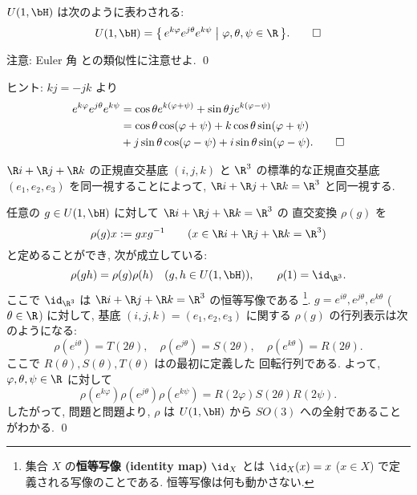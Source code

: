 \documentclass[12pt,twoside]{jarticle}
\begin{document}
\begin{question}
\label{q:U(1,H)-Euler-angle}
  $U(1,\bH)$ は次のように表わされる:
  \begin{equation*}
    U(1,\bH) =
    \bigl\{\, e^{k\varphi}e^{j\theta}e^{k\psi}
    \bigm| \varphi,\theta,\psi\in\R \,\bigr\}.
    \qed
  \end{equation*}
\end{question}

\noindent
注意: Euler 角  との類似性に注意せよ.
\qed

\medskip
\noindent
ヒント: $kj=-jk$ より
\begin{align*}
  e^{k\varphi}e^{j\theta}e^{k\psi}
  &= \cos\theta e^{k(\varphi+\psi)} + \sin\theta j e^{k(\varphi-\psi)}
  \\
  &= \cos\theta\cos(\varphi+\psi) + k\cos\theta\sin(\varphi+\psi)
  \\
  &+ j\sin\theta\cos(\varphi-\psi) + i\sin\theta\sin(\varphi-\psi).
\qed
\end{align*}

\medskip

$\R i+\R j+\R k$ の正規直交基底 $(i,j,k)$ 
と $\R^3$ の標準的な正規直交基底 $(e_1,e_2,e_3)$ 
を同一視することによって, $\R i+\R j+\R k=\R^3$ と同一視する.

\begin{question}
\label{q:rho:U(1,H)toSO(3)}
  任意の $g\in U(1,\bH)$ に対して $\R i+\R j+\R k=\R^3$ の
  直交変換 $\rho(g)$ を
  \begin{equation*}
    \rho(g)x := gxg^{-1} \qquad (x\in\R i+\R j+\R k=\R^3)
  \end{equation*}
  と定めることができ, 次が成立している:
  \begin{equation*}
    \rho(gh)=\rho(g)\rho(h) \quad (g,h\in U(1,\bH)),
    \qquad
    \rho(1)=\id_{\R^3}.
  \end{equation*}
  ここで $\id_{\R^3}$ は $\R i+\R j+\R k=\R^3$ の恒等写像である%
  \footnote{集合 $X$ の{\bf 恒等写像 (identity map)} $\id_X$ 
    とは $\id_X(x)=x$ ($x\in X$) で定義される写像のことである.
    恒等写像は何も動かさない.}.
  $g=e^{i\theta},e^{j\theta},e^{k\theta}$ ($\theta\in\R$) に対して, 
  基底 $(i,j,k)=(e_1,e_2,e_3)$ に関する $\rho(g)$ の行列表示は次のようになる:
  \begin{equation*}
    \rho(e^{i\theta}) = T(2\theta), \quad
    \rho(e^{j\theta}) = S(2\theta), \quad
    \rho(e^{k\theta}) = R(2\theta).
  \end{equation*}
  ここで $R(\theta),S(\theta),T(\theta)$ はの最初に定義した
  回転行列である.  よって, $\varphi,\theta,\psi\in\R$ に対して
  \begin{equation*}
    \rho(e^{k\varphi})\rho(e^{j\theta})\rho(e^{k\psi})
    = R(2\varphi)S(2\theta)R(2\psi).
  \end{equation*}
  したがって, 問題と問題より,
  $\rho$ は $U(1,\bH)$ から $SO(3)$ への全射であることがわかる.
  \qed
\end{question}
\end{document}
